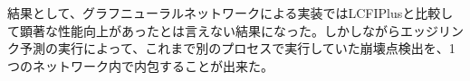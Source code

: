 結果として、グラフニューラルネットワークによる実装ではLCFIPlusと比較して顕著な性能向上があったとは言えない結果になった。しかしながらエッジリンク予測の実行によって、これまで別のプロセスで実行していた崩壊点検出を、1つのネットワーク内で内包することが出来た。